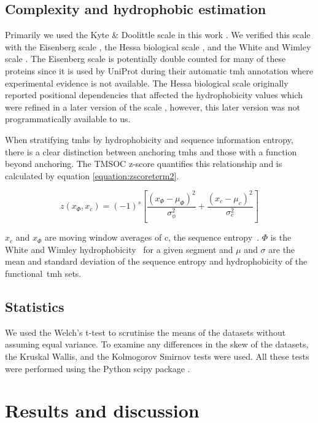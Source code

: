 \subsection{Complexity and hydrophobic estimation}
Primarily we used the Kyte \& Doolittle scale in this work \cite{Kyte1982}.
We verified this scale with the Eisenberg scale \cite{Eisenberg1984}, the Hessa biological scale \cite{Hessa2005}, and the White and Wimley scale \cite{White1999}.
The Eisenberg scale is potentially double counted for many of these proteins since it is used by UniProt during their automatic \gls{tmh} annotation where experimental evidence is not available.
The Hessa biological scale originally reported positional dependencies that affected the hydrophobicity values which were refined in a later version of the scale \cite{Hessa2007}, however, this later version was not programmatically available to us.

When stratifying \gls{tmh}s by hydrophobicity and sequence information entropy, there is a clear distinction between anchoring \gls{tmh}s and those with a function beyond anchoring.
The TMSOC  z\--score quantifies this relationship and is calculated by equation \ref{equation:zscoreterm2}.

\begin{equation} \label{equation:zscoreterm2}
z({x}_{\Phi},{x}_{c})={(-1)}^{s}\left[\frac{{({x}_{\Phi}-{\mu}_{\Phi})}^{2}}{{\sigma}_{\phi}^{2}}+\frac{{({x}_{c}-{\mu}_{c})}^{2}}{{\sigma}_{c}^{2}}\right]
\end{equation}

$x_c$ and $x_\Phi$ are moving window averages of c, the sequence entropy~\cite{Wootton1996}. $\Phi$ is the White and Wimley hydrophobicity~\cite{White1999} for a given segment and $\mu$ and $\sigma$ are the mean and standard deviation of the sequence entropy and hydrophobicity of the functional~\gls{tmh} sets.

\subsection{Statistics}

We used the Welch's t\--test to scrutinise the means of the datasets without assuming equal variance.
To examine any differences in the skew of the datasets, the Kruskal Wallis, and the Kolmogorov Smirnov tests were used.
All these tests were performed using the Python scipy package \cite{Oliphant2007}.


\section{Results and discussion}

